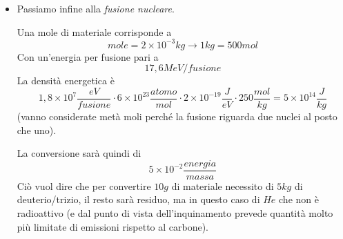\begin{itemize}
\item Passiamo infine alla \emph{fusione nucleare}.

Una mole di materiale corrisponde a 
\begin{equation}
mole=2\times10^{-3}kg\to 1kg=500mol
\end{equation}
Con un'energia per fusione pari a 
\begin{equation}
17,6MeV/fusione
\end{equation}
La densità energetica è
\begin{equation}
1,8\times 10^7\frac{eV}{fusione}\cdot 6\times10^{23}\frac{atomo}{mol}\cdot 2\times 10^{-19}\frac{J}{eV}\cdot 250\frac{mol}{kg}=5\times 10^14\frac{J}{kg}
\end{equation}
(vanno considerate metà moli perché la fusione riguarda due nuclei al posto che uno).

La conversione sarà quindi di 
\begin{equation}
5\times 10^{-2}\frac{energia}{massa}
\end{equation}
Ciò vuol dire che per convertire $10g$ di materiale necessito di $5kg$ di deuterio/trizio, il resto sarà residuo, ma in questo caso di $He$ che non è radioattivo (e dal punto di vista dell'inquinamento prevede quantità molto più limitate di emissioni rispetto al carbone).
\end{itemize}